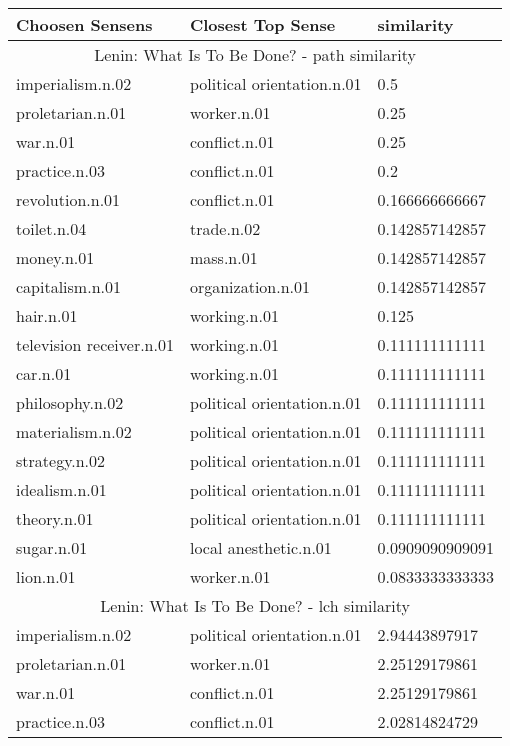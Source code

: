 
    \begin{center}
      \begin{tabular}{ | l | l | l |}
        \hline
        Choosen Sensens & Closest Top Sense & similarity  \\ \hline
\multicolumn{3}{|c|}{Lenin: What Is To Be Done? - path similarity} \\ \hline
imperialism.n.02 & political orientation.n.01 & 0.5 \\ \hline
proletarian.n.01 & worker.n.01 & 0.25 \\ \hline
war.n.01 & conflict.n.01 & 0.25 \\ \hline
practice.n.03 & conflict.n.01 & 0.2 \\ \hline
revolution.n.01 & conflict.n.01 & 0.166666666667 \\ \hline
toilet.n.04 & trade.n.02 & 0.142857142857 \\ \hline
money.n.01 & mass.n.01 & 0.142857142857 \\ \hline
capitalism.n.01 & organization.n.01 & 0.142857142857 \\ \hline
hair.n.01 & working.n.01 & 0.125 \\ \hline
television receiver.n.01 & working.n.01 & 0.111111111111 \\ \hline
car.n.01 & working.n.01 & 0.111111111111 \\ \hline
philosophy.n.02 & political orientation.n.01 & 0.111111111111 \\ \hline
materialism.n.02 & political orientation.n.01 & 0.111111111111 \\ \hline
strategy.n.02 & political orientation.n.01 & 0.111111111111 \\ \hline
idealism.n.01 & political orientation.n.01 & 0.111111111111 \\ \hline
theory.n.01 & political orientation.n.01 & 0.111111111111 \\ \hline
sugar.n.01 & local anesthetic.n.01 & 0.0909090909091 \\ \hline
lion.n.01 & worker.n.01 & 0.0833333333333 \\ \hline
\multicolumn{3}{|c|}{Lenin: What Is To Be Done? - lch similarity} \\ \hline
imperialism.n.02 & political orientation.n.01 & 2.94443897917 \\ \hline
proletarian.n.01 & worker.n.01 & 2.25129179861 \\ \hline
war.n.01 & conflict.n.01 & 2.25129179861 \\ \hline
practice.n.03 & conflict.n.01 & 2.02814824729 \\ \hline

\end{tabular}
\end{center}

